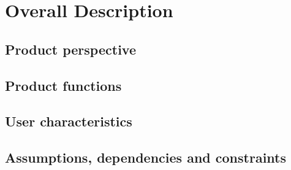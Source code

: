 \section{Overall Description}

\subsection{Product perspective}

\subsection{Product functions}

\subsection{User characteristics}

\subsection{Assumptions, dependencies and constraints}
